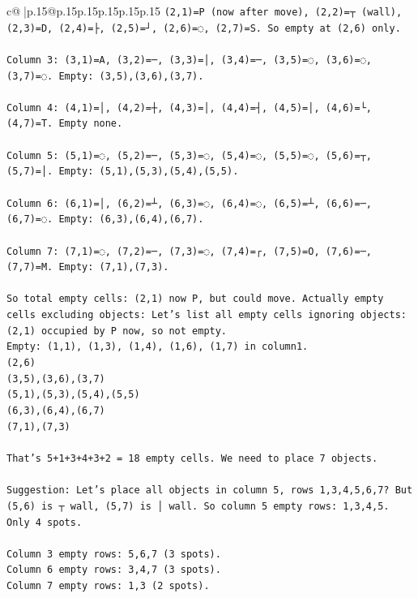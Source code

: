 \documentclass{article}
\begin{document}
{\begin{supertabular}{c@{$\;$}|p{.15\linewidth}@{}p{.15\linewidth}p{.15\linewidth}p{.15\linewidth}p{.15\linewidth}p{.15\linewidth}}
{{{\texttt{(2,1)=P (now after move), (2,2)=┬ (wall), (2,3)=D, (2,4)=├, (2,5)=┘, (2,6)=◌, (2,7)=S. So empty at (2,6) only.} \\
\\ 
\texttt{Column 3: (3,1)=A, (3,2)=─, (3,3)=│, (3,4)=─, (3,5)=◌, (3,6)=◌, (3,7)=◌. Empty: (3,5),(3,6),(3,7).} \\
\\ 
\texttt{Column 4: (4,1)=│, (4,2)=┼, (4,3)=│, (4,4)=┤, (4,5)=│, (4,6)=└, (4,7)=T. Empty none.} \\
\\ 
\texttt{Column 5: (5,1)=◌, (5,2)=─, (5,3)=◌, (5,4)=◌, (5,5)=◌, (5,6)=┬, (5,7)=│. Empty: (5,1),(5,3),(5,4),(5,5).} \\
\\ 
\texttt{Column 6: (6,1)=│, (6,2)=┴, (6,3)=◌, (6,4)=◌, (6,5)=┴, (6,6)=─, (6,7)=◌. Empty: (6,3),(6,4),(6,7).} \\
\\ 
\texttt{Column 7: (7,1)=◌, (7,2)=─, (7,3)=◌, (7,4)=┌, (7,5)=O, (7,6)=─, (7,7)=M. Empty: (7,1),(7,3).} \\
\\ 
\texttt{So total empty cells: (2,1) now P, but could move. Actually empty cells excluding objects: Let's list all empty cells ignoring objects:  } \\
\texttt{(2,1) occupied by P now, so not empty.  } \\
\texttt{Empty: (1,1), (1,3), (1,4), (1,6), (1,7) in column1.  } \\
\texttt{(2,6)  } \\
\texttt{(3,5),(3,6),(3,7)  } \\
\texttt{(5,1),(5,3),(5,4),(5,5)  } \\
\texttt{(6,3),(6,4),(6,7)  } \\
\texttt{(7,1),(7,3)} \\
\\ 
\texttt{That's 5+1+3+4+3+2 = 18 empty cells. We need to place 7 objects.} \\
\\ 
\texttt{Suggestion: Let's place all objects in column 5, rows 1,3,4,5,6,7? But (5,6) is ┬ wall, (5,7) is │ wall. So column 5 empty rows: 1,3,4,5. Only 4 spots.} \\
\\ 
\texttt{Column 3 empty rows: 5,6,7 (3 spots).  } \\
\texttt{Column 6 empty rows: 3,4,7 (3 spots).  } \\
\texttt{Column 7 empty rows: 1,3 (2 spots).  } \\
}}}
\end{supertabular}}
\end{document}
